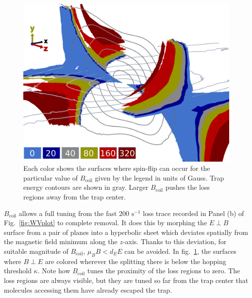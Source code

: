 \documentclass[%
 reprint,
 amsmath,amssymb,
 aps,
prl,
]{revtex4-1}
\begin{document}
\begin{figure}[tb]
\includegraphics[width=\linewidth]{LossSurfaces/Loss_Surface_Chunks_recolored_legend.png}%
\caption{
Each color shows the surfaces where spin-flip can occur for the particular value of $B_\text{coil}$ given by the legend in units of Gauss. Trap energy contours are shown in gray. Larger $B_\text{coil}$ pushes the loss regions away from the trap center.
\label{fig:LSurfs}}
\end{figure}

$B_\text{coil}$ allows a full tuning from the fast $200\text{ s}^{-1}$ loss trace recorded in Panel (b) of Fig.~\ref{fig:WVplot} to complete removal. It does this by morphing the $E\!\perp\! B$ surface from a pair of planes into a hyperbolic sheet which deviates spatially from the magnetic field minimum along the $z$-axis. Thanks to this deviation, for suitable magnitude of $B_\text{coil}$, $\mu_BB< d_EE$ can be avoided. In fig.~\ref{fig:LSurfs}, the surfaces where $B\!\perp\! E$ are colored wherever the splitting there is below the hopping threshold $\kappa$. Note how $B_\text{coil}$ tunes the proximity of the loss regions to zero. The loss regions are always visible, but they are tuned so far from the trap center that molecules accessing them have already escaped the trap.
\end{document}
